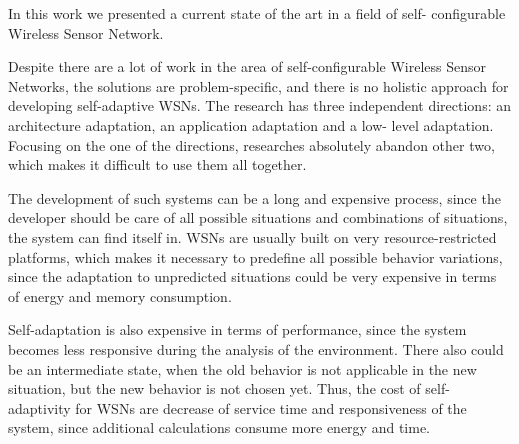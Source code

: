 In this work we presented a current state of the art in a field of self-
configurable Wireless Sensor Network. 

Despite there are a lot of work in the area of self-configurable Wireless
Sensor Networks, the solutions are problem-specific, and there is no holistic
approach for developing self-adaptive WSNs. The research has three independent
directions: an architecture adaptation, an application adaptation and a low-
level adaptation. Focusing on the one of the directions, researches absolutely
abandon other two, which makes it difficult to use them all together.

The development of such systems can be a long and expensive process, since
the developer should be care of all possible situations and combinations of
situations, the system can find itself in. WSNs are usually built on very
resource-restricted platforms, which makes it necessary to predefine all
possible behavior variations, since the adaptation to unpredicted situations
could be very expensive in terms of energy and memory consumption.

Self-adaptation is also expensive in terms of performance, since the system
becomes less responsive during the analysis of the environment. There also could
be an intermediate state, when the old behavior is not applicable in the new
situation, but the new behavior is not chosen yet. Thus, the cost of self-
adaptivity for WSNs are decrease of service time and responsiveness of the
system, since additional calculations consume more energy and time.